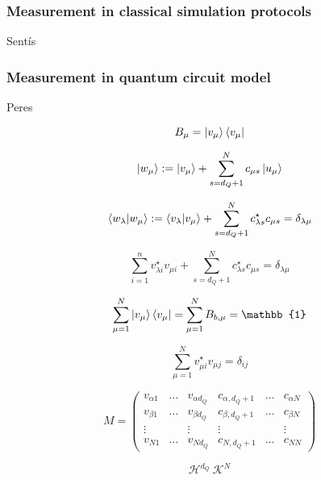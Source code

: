 \subsubsection{Measurement in classical simulation protocols}
Sent\'is \cite{sentis2013}
\subsubsection{Measurement in quantum circuit model}
Peres \cite{peres1995}

\begin{equation}
B_{\mu} = \ket{v_{\mu}} \bra{v_{\mu}}
\end{equation}

\begin{equation}
\ket{w_{\mu}} := \ket{v_{\mu}} + \sum_{s=d_{Q}+1}^{N} c_{\mu s} \ket{u_{\mu}}
\end{equation}

\begin{equation}
\bra{w_{\lambda}} \ket{w_{\mu}} := \bra{v_{\lambda}} \ket{v_{\mu}} + \sum_{s=d_{Q}+1}^{N} c_{\lambda s}^{\star} c_{\mu s} = \delta_{\lambda \mu}
\end{equation}

\begin{equation}
\sum_{i=1}^{n} v_{\lambda i}^{\star} v_{\mu i} + \sum_{s=d_{Q}+1}^{N} c_{\lambda s}^{\star} c_{\mu s} = \delta_{\lambda \mu}
\end{equation}

\begin{equation}
\sum_{\mu=1}^{N}\ket{v_{\mu}}\bra{v_{\mu}} = \sum_{\mu=1}^{N} B_{b,\mu} = \mathbb{1}
\end{equation}


\begin{equation}
\sum_{\mu=1}^{N}v_{\mu i}^{\star} v_{\mu j} = \delta_{ij}
\end{equation}

\begin{equation}
M = 
\begin{pmatrix}
v_{\alpha 1} & \dots & v_{\alpha d_{Q}} & c_{\alpha,d_{Q}+1} & \dots & c_{\alpha N} \\
v_{\beta 1} & \dots & v_{\beta d_{Q}} & c_{\beta,d_{Q}+1} & \dots & c_{\beta N} \\
\vdots &  & \vdots & \vdots &  & \vdots \\
v_{N1} & \dots & v_{Nd_{Q}} & c_{N,d_Q+1} & \dots & c_{NN}
\end{pmatrix}    
\end{equation}

\[\mathcal{H}^{d_Q}\ \mathcal{K}^{N}\]